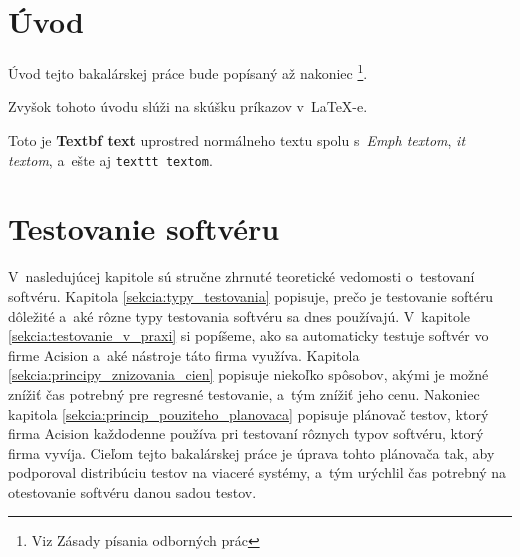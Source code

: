 



%
%
\chapter{Úvod}
\label{kapitola:uvod}
Úvod tejto bakalárskej práce bude popísaný až nakoniec \footnote{Viz Zásady písania odborných prác}.

Zvyšok tohoto úvodu slúži na skúšku príkazov v~\LaTeX-e.

Toto je \textbf{Textbf text} uprostred normálneho textu spolu s~\emph{Emph textom}, {\it it textom}, a~ešte aj \texttt{texttt textom}.



%
%
\chapter{Testovanie softvéru}
\label{kapitola:testovanie_softveru}

V~nasledujúcej kapitole sú stručne zhrnuté teoretické vedomosti o~testovaní softvéru.
Kapitola \ref{sekcia:typy_testovania} popisuje, prečo je testovanie softéru dôležité a~aké rôzne typy
testovania softvéru sa dnes používajú.
V~kapitole \ref{sekcia:testovanie_v_praxi} si popíšeme, ako sa automaticky testuje softvér vo firme Acision a~aké nástroje táto firma využíva.
Kapitola \ref{sekcia:principy_znizovania_cien} popisuje niekoľko spôsobov, akými je možné znížiť 
čas potrebný pre regresné testovanie, a~tým znížiť jeho cenu. 
Nakoniec kapitola \ref{sekcia:princip_pouziteho_planovaca} popisuje plánovač testov, ktorý firma Acision každodenne používa 
pri testovaní rôznych typov softvéru, ktorý firma vyvíja. 
Cieľom tejto bakalárskej práce je úprava tohto plánovača tak, aby podporoval distribúciu testov na viaceré systémy,
a~tým urýchlil čas potrebný na otestovanie softvéru danou sadou testov. 

